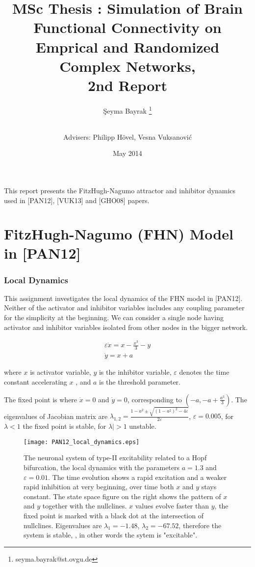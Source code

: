 \documentclass[12pt]{article}
\title{MSc Thesis : Simulation of Brain Functional Connectivity on Emprical and Randomized Complex Networks, \\ 2nd Report}
\author[1]{\c{S}eyma Bayrak \thanks{seyma.bayrak@st.ovgu.de}}
\author[ ]{\\ Advisers: Philipp H\"{o}vel, Vesna Vuksanovi\'c}
\affil[1]{\footnotesize{Integrative Neuroscience MSc, Otto von Guericke University, Magdeburg}}
\date{May 2014}
\begin{document}
   \maketitle
   
This report presents the FitzHugh-Nagumo attractor and inhibitor dynamics used in [PAN12], [VUK13] and [GHO08] papers. 

\section{FitzHugh-Nagumo (FHN) Model in [PAN12]} 

\subsubsection{Local Dynamics}

This assignment investigates the local dynamics of the FHN model in [PAN12]. Neither of the activator and inhibitor variables includes any coupling parameter for the simplicity at the beginning. We can consider a single node having activator and inhibitor variables isolated from other nodes in the bigger network. 
   
\begin{subequations} \begin{align} \varepsilon  \dot{x} = x - \frac{x^3}{3} -y   \label{eqn: frobenius 6}\\  \dot{y} = x+a \label{eqn: frobenius 7}   \end{align} 
\end{subequations}

where $x$ is activator variable, $y$ is the inhibitor variable, $\varepsilon$ denotes the time constant accelerating $x$ , and $a$ is the threshold parameter. 


The fixed point is where $\dot{x}=0$ and $\dot{y}=0$, corresponding 
to $( -a, -a+\frac{a^3}{3} )$. The eigenvalues of Jacobian matrix are 
 $\lambda_{1,2}=\frac{1-a^2\pm \sqrt{(1-a^2)^2-4\varepsilon}}{2\varepsilon}$, $\varepsilon=0.005$, for $\lambda<1$ the fixed point is stable, for $\lambda|>1$ unstable.


\begin{figure}[h!]
	\centering
	\texttt{[image: PAN12\_local\_dynamics.eps]}
	\caption{The neuronal system of type-II excitability related to a Hopf bifurcation, the local dynamics with the parameters $a=1.3$ and $\varepsilon = 0.01$. The time evolution shows a rapid excitation and a weaker rapid inhibition at very beginning, over time both $x$ and $y$ stays constant. The state space figure on the right shows the pattern of $x$ and $y$ together with the nullclines. $x$ values evolve faster than $y$, the fixed point is marked with a black dot at the intersection of nullclines. Eigenvalues are $\lambda_1=-1.48$, $\lambda_2 = -67.52$, therefore the system is stable, , in other words the sytem is "excitable". }
\end{figure}
\end{document}
